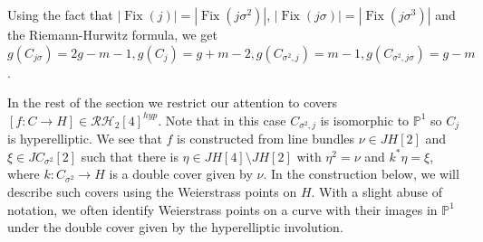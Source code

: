 \documentclass{article}
\numberwithin{equation}{section}
\newcommand{\s}{\sigma}
\DeclareMathOperator{\Fix}{Fix}
\begin{document}
\begin{center}
\label{diagram1}
\end{center}

Using the fact that $|\Fix(j)| = |\Fix(j\sigma^2)|$, $|\Fix(j\s)| = |\Fix(j\sigma^3)|$ and the Riemann-Hurwitz formula, we get $g(C_{j\s}) = 2g-m-1, g(C_{j}) = g+m-2, g(C_{\sigma^2, j}) = m-1, g(C_{\sigma^2, j\s}) = g-m$. 

In the rest of the section we restrict our attention to covers $[f: C \to H] \in \mathcal{RH}_2[4]^{hyp}$. Note that in this case $C_{\sigma^2,j}$ is isomorphic to $\mathbb{P}^1$ so $C_j$ is hyperelliptic. We see that $f$ is constructed from line bundles $\nu \in JH[2]$ and $\xi \in JC_{\sigma^2}[2]$ such that there is $\eta \in JH[4] \setminus JH[2]$ with $\eta^2 = \nu$ and $k^*\eta = \xi$, where $k: C_{\sigma^2} \to H$ is a double cover given by $\nu$. 
In the construction below, we will describe such covers using the Weierstrass points on $H$. With a slight abuse of notation, we often identify Weierstrass points on a curve with their images in $\mathbb{P}^1$ under the double cover given by the hyperelliptic involution.
\end{document}
